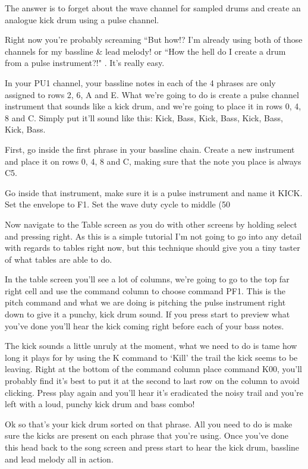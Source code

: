\documentclass[]{article}
\begin{document}
The answer is to forget about the wave channel for sampled drums and create an analogue kick drum using a pulse channel.

Right now you're probably screaming “But how!? I'm already using both of those channels for my bassline \& lead melody! or “How the hell do I create a drum from a pulse instrument?!" . It's really easy.

In your PU1 channel, your bassline notes in each of the 4 phrases are only assigned to rows 2, 6, A and E. What we're going to do is create a pulse channel instrument that sounds like a kick drum, and we're going to place it in rows 0, 4, 8 and C. Simply put it'll sound like this: Kick, Bass, Kick, Bass, Kick, Bass, Kick, Bass.

First, go inside the first phrase in your bassline chain. Create a new instrument and place it on rows 0, 4, 8 and C, making sure that the note you place is always C5.

Go inside that instrument, make sure it is a pulse instrument and name it KICK. Set the envelope to F1. Set the wave duty cycle to middle (50%

Now navigate to the Table screen as you do with other screens by holding select and pressing right. As this is a simple tutorial I'm not going to go into any detail with regards to tables right now, but this technique should give you a tiny taster of what tables are able to do.

In the table screen you'll see a lot of columns, we're going to go to the top far right cell and use the command column to choose command PF1. This is the pitch command and what we are doing is pitching the pulse instrument right down to give it a punchy, kick drum sound. If you press start to preview what you've done you'll hear the kick coming right before each of your bass notes.

The kick sounds a little unruly at the moment, what we need to do is tame how long it plays for by using the K command to ‘Kill' the trail the kick seems to be leaving. Right at the bottom of the command column place command K00, you'll probably find it's best to put it at the second to last row on the column to avoid clicking. Press play again and you'll hear it's eradicated the noisy trail and you're left with a loud, punchy kick drum and bass combo!

Ok so that's your kick drum sorted on that phrase. All you need to do is make sure the kicks are present on each phrase that you're using. Once you've done this head back to the song screen and press start to hear the kick drum, bassline and lead melody all in action.
\end{document}
